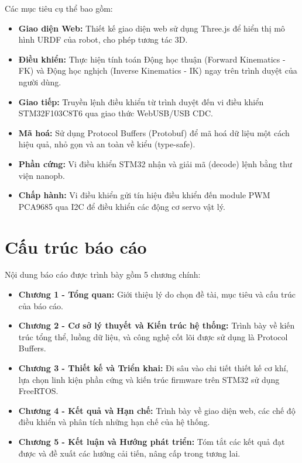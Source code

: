 \documentclass[12pt, a4paper, oneside]{report}
\numberwithin{equation}{chapter} %
\numberwithin{figure}{chapter}   %
\numberwithin{table}{chapter}    %
\begin{document}
Các mục tiêu cụ thể bao gồm:
\begin{itemize}
    \item \textbf{Giao diện Web:} Thiết kế giao diện web sử dụng Three.js để hiển thị mô hình URDF của robot, cho phép tương tác 3D.
    \item \textbf{Điều khiển:} Thực hiện tính toán Động học thuận (Forward Kinematics - FK) và Động học nghịch (Inverse Kinematics - IK) ngay trên trình duyệt của người dùng.
    \item \textbf{Giao tiếp:} Truyền lệnh điều khiển từ trình duyệt đến vi điều khiển STM32F103C8T6 qua giao thức WebUSB/USB CDC.
    \item \textbf{Mã hoá:} Sử dụng Protocol Buffers (Protobuf) để mã hoá dữ liệu một cách hiệu quả, nhỏ gọn và an toàn về kiểu (type-safe).
    \item \textbf{Phần cứng:} Vi điều khiển STM32 nhận và giải mã (decode) lệnh bằng thư viện nanopb.
    \item \textbf{Chấp hành:} Vi điều khiển gửi tín hiệu điều khiển đến module PWM PCA9685 qua I2C để điều khiển các động cơ servo vật lý.
\end{itemize}

\section{Cấu trúc báo cáo}

Nội dung báo cáo được trình bày gồm 5 chương chính:
\begin{itemize}
    \item \textbf{Chương 1 - Tổng quan:} Giới thiệu lý do chọn đề tài, mục tiêu và cấu trúc của báo cáo.
    \item \textbf{Chương 2 - Cơ sở lý thuyết và Kiến trúc hệ thống:} Trình bày về kiến trúc tổng thể, luồng dữ liệu, và công nghệ cốt lõi được sử dụng là Protocol Buffers.
    \item \textbf{Chương 3 - Thiết kế và Triển khai:} Đi sâu vào chi tiết thiết kế cơ khí, lựa chọn linh kiện phần cứng và kiến trúc firmware trên STM32 sử dụng FreeRTOS.
    \item \textbf{Chương 4 - Kết quả và Hạn chế:} Trình bày về giao diện web, các chế độ điều khiển và phân tích những hạn chế của hệ thống.
    \item \textbf{Chương 5 - Kết luận và Hướng phát triển:} Tóm tắt các kết quả đạt được và đề xuất các hướng cải tiến, nâng cấp trong tương lai.
\end{itemize}
\end{document}
